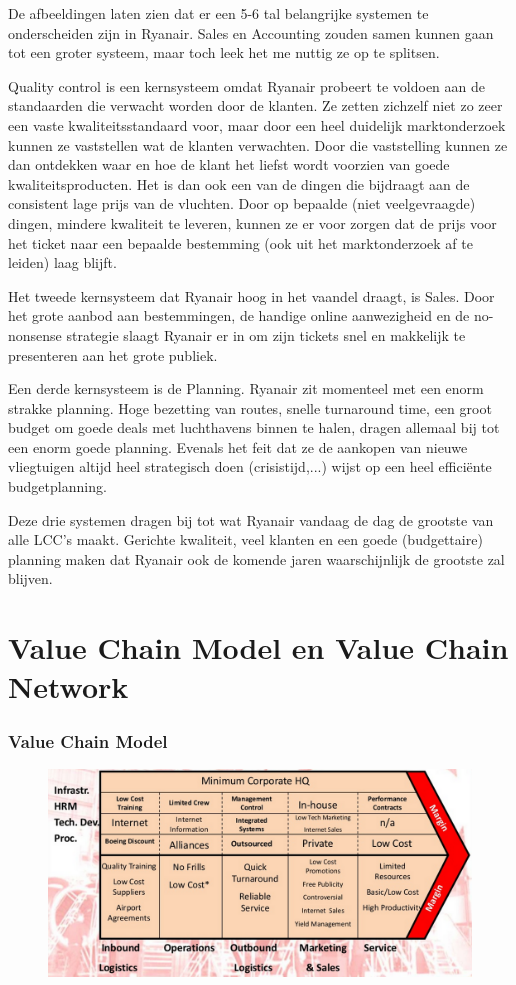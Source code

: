 \documentclass{article}
\begin{document}
\newpage

De afbeeldingen laten zien dat er een 5-6 tal belangrijke systemen te onderscheiden zijn in Ryanair. Sales en Accounting zouden samen kunnen gaan tot een groter systeem, maar toch leek het me nuttig ze op te splitsen.

Quality control is een kernsysteem omdat Ryanair probeert te voldoen aan de standaarden die verwacht worden door de klanten. Ze zetten zichzelf niet zo zeer een vaste kwaliteitsstandaard voor, maar door een heel duidelijk marktonderzoek kunnen ze vaststellen wat de klanten verwachten. Door die vaststelling kunnen ze dan ontdekken waar en hoe de klant het liefst wordt voorzien van goede kwaliteitsproducten. Het is dan ook een van de dingen die bijdraagt aan de consistent lage prijs van de vluchten. Door op bepaalde (niet veelgevraagde) dingen, mindere kwaliteit te leveren, kunnen ze er voor zorgen dat de prijs voor het ticket naar een bepaalde bestemming (ook uit het marktonderzoek af te leiden) laag blijft.

Het tweede kernsysteem dat Ryanair hoog in het vaandel draagt, is Sales. Door het grote aanbod aan bestemmingen, de handige online aanwezigheid en de no-nonsense strategie slaagt Ryanair er in om zijn tickets snel en makkelijk te presenteren aan het grote publiek.

Een derde kernsysteem is de Planning. Ryanair zit momenteel met een enorm strakke planning. Hoge bezetting van routes, snelle turnaround time, een groot budget om goede deals met luchthavens binnen te halen, dragen allemaal bij tot een enorm goede planning. Evenals het feit dat ze de aankopen van nieuwe vliegtuigen altijd heel strategisch doen (crisistijd,...) wijst op een heel effici\"ente budgetplanning.

Deze drie systemen dragen bij tot wat Ryanair vandaag de dag de grootste van alle LCC's maakt. Gerichte kwaliteit, veel klanten en een goede (budgettaire) planning maken dat Ryanair ook de komende jaren waarschijnlijk de grootste zal blijven.

\part{Value Chain Model en Value Chain Network}
\setcounter{section}{0}
\section{Value Chain Model}
\begin{figure}[h]
\centering
\includegraphics[scale=0.344]{image4}
\end{figure}
\end{document}
